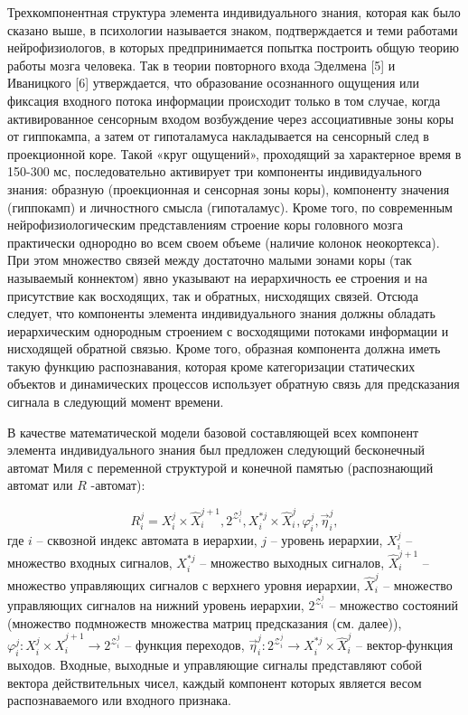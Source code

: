 \documentclass{svjour3}                     %
\begin{document}
Трехкомпонентная структура элемента индивидуального знания, которая как было сказано выше, в психологии называется знаком, подтверждается и теми работами нейрофизиологов, в которых предпринимается попытка построить общую теорию работы мозга человека. Так в теории повторного входа Эделмена [5] и Иваницкого [6] утверждается, что образование осознанного ощущения или фиксация входного потока информации происходит только в том случае, когда активированное сенсорным входом возбуждение через ассоциативные зоны коры от гиппокампа, а затем от гипоталамуса накладывается на сенсорный след в проекционной коре. Такой «круг ощущений», проходящий за характерное время в 150-300 мс, последовательно активирует три компоненты индивидуального знания: образную (проекционная и сенсорная зоны коры), компоненту значения (гиппокамп) и личностного смысла (гипоталамус).
Кроме того, по современным нейрофизиологическим представлениям строение коры головного мозга практически однородно во всем своем объеме (наличие колонок неокортекса). При этом множество связей между достаточно малыми зонами коры (так называемый коннектом) явно указывают на иерархичность ее строения и на присутствие как восходящих, так и обратных, нисходящих связей. Отсюда следует, что компоненты элемента индивидуального знания должны обладать иерархическим однородным строением с восходящими потоками информации и нисходящей обратной связью. Кроме того, образная компонента должна иметь такую функцию распознавания, которая кроме категоризации статических объектов и динамических процессов использует обратную связь для предсказания сигнала в следующий момент времени.

В качестве математической модели базовой составляющей всех компонент элемента индивидуального знания был предложен следующий бесконечный автомат Миля с переменной структурой и конечной памятью (распознающий автомат или $R$ -автомат):

\[
	R_{i}^{j}=X_{i}^{j}\times \hat{X}_{i}^{j+1}{{,2}^{\mathcal{Z}_{i}^{j}}},X_{i}^{*j}\times \hat{X}_{i}^{j},\varphi _{i}^{j},\vec{\eta }_{i}^{j},
\]
где $i$ – сквозной индекс автомата в иерархии, $j$ – уровень иерархии, $X_{i}^{j}$ – множество входных сигналов, $X_{i}^{*j}$ – множество выходных сигналов, $\hat{X}_{i}^{j+1}$ – множество управляющих сигналов с верхнего уровня иерархии, $\hat{X}_{i}^{j}$ – множество управляющих сигналов на нижний уровень иерархии, ${{2}^{\mathcal{Z}_{i}^{j}}}$ – множество состояний (множество подмножеств множества матриц предсказания (см. далее)), $\varphi _{i}^{j}:X_{i}^{j}\times \hat{X}_{i}^{j+1}\to {{2}^{\mathcal{Z}_{i}^{j}}}$ – функция переходов, $\vec{\eta }_{i}^{j}:{{2}^{\mathcal{Z}_{i}^{j}}}\to X_{i}^{*j}\times \hat{X}_{i}^{j}$ – вектор-функция выходов. Входные, выходные и управляющие сигналы представляют собой вектора действительных чисел, каждый компонент которых является весом распознаваемого или входного признака.
\end{document}
